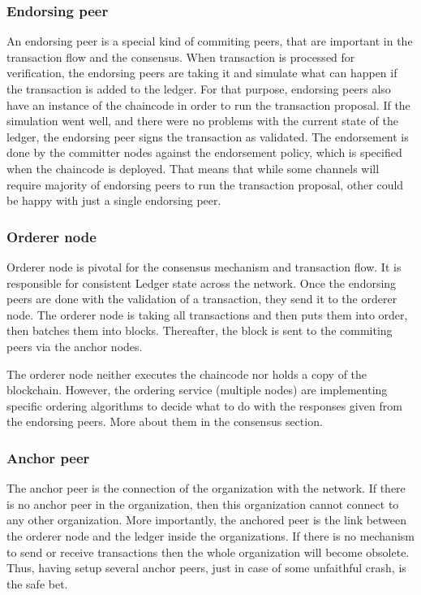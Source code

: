 \documentclass[a4paper,11pt]{report}
\begin{document}
\subsubsection{Endorsing peer}
An endorsing peer is a special kind of commiting peers, that are important in the transaction flow and the consensus. When transaction is processed for verification, the endorsing peers are taking it and simulate what can happen if the transaction is added to the ledger. For that purpose, endorsing peers also have an instance of the chaincode in order to run the transaction proposal. If the simulation went well, and there were no problems with the current state of the ledger, the endorsing peer signs the transaction as validated. The endorsement is done by the committer nodes against the endorsement policy, which is specified when the chaincode is deployed. That means that while some channels will require majority of endorsing peers to run the transaction proposal, other could be happy with just a single endorsing peer.

\subsubsection{Orderer node}
Orderer node is pivotal for the consensus mechanism and transaction flow. It is responsible for consistent Ledger state across the network. Once the endorsing peers are done with the validation of a transaction, they send it to the orderer node. The orderer node is taking all transactions and then puts them into order, then batches them into blocks. Thereafter, the block is sent to the commiting peers via the anchor nodes.

	The orderer node neither executes the chaincode nor holds a copy of the blockchain. However, the ordering service (multiple nodes) are implementing specific ordering algorithms to decide what to do with the responses given from the endorsing peers. More about them in the consensus section.
\subsubsection{Anchor peer}
The anchor peer is the connection of the organization with the network. If there is no anchor peer in the organization, then this organization cannot connect to any other organization. More importantly, the anchored peer is the link between the orderer node and the ledger inside the organizations. If there is no mechanism to send or receive transactions then the whole organization will become obsolete. Thus, having setup several anchor peers, just in case of some unfaithful crash, is the safe bet.  
\end{document}
